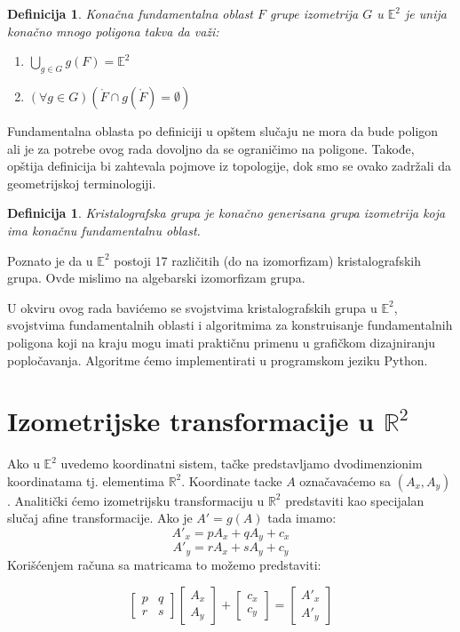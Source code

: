 \documentclass[11pt]{article}
\newtheorem{definition}[theorem]{\bf Definicija}
\begin{document}
\begin{definition} Konačna fundamentalna oblast \(F\)
grupe izometrija \(G\) u \(\mathbb{E}^2\) je unija konačno mnogo
poligona takva da važi:\\
\begin{enumerate}
\item \(\displaystyle{\bigcup_{g\in G}g(F)} = \mathbb{E}^2\) 
\item \((\forall g\in G)(\mathring{F} \cap g(\mathring{F})= \emptyset)\)
\end{enumerate}
\end{definition}
    Fundamentalna oblasta po definiciji u opštem slučaju ne mora da bude
poligon ali je za potrebe ovog rada dovoljno da se ograničimo na
poligone. Takođe, opštija definicija bi zahtevala pojmove iz topologije,
dok smo se ovako zadržali da geometrijskoj terminologiji.

\begin{definition} Kristalografska grupa je konačno
generisana grupa izometrija koja ima konačnu fundamentalnu oblast.
\end{definition}
    Poznato je da u \(\mathbb{E}^2\) postoji 17 različitih (do na
izomorfizam) kristalografskih grupa. Ovde mislimo na algebarski
izomorfizam grupa.

    U okviru ovog rada bavićemo se svojstvima kristalografskih grupa u
\(\mathbb{E}^2\), svojstvima fundamentalnih oblasti i algoritmima za
konstruisanje fundamentalnih poligona koji na kraju mogu imati praktičnu
primenu u grafičkom dizajniranju popločavanja. Algoritme ćemo
implementirati u programskom jeziku Python.

    \section{\texorpdfstring{Izometrijske transformacije u
\(\mathbb{R}^2\)}{Izometrijske transformacije u \textbackslash{}mathbb\{R\}\^{}2}}\label{izometrijske-transformacije-u-mathbbr2}

    Ako u \(\mathbb{E}^2\) uvedemo koordinatni sistem, tačke predstavljamo
dvodimenzionim koordinatama tj. elementima \(\mathbb{R}^2\). Koordinate
tacke \(A\) označavaćemo sa \((A_x, A_y)\). Analitički ćemo izometrijsku
transformaciju u \(\mathbb{R}^2\) predstaviti kao specijalan slučaj
afine transformacije. Ako je \(A' = g(A)\) tada imamo:
\[A'_x = pA_x + qA_y + c_x\] \[A'_y = rA_x + sA_y + c_y\] Korišćenjem
računa sa matricama to možemo predstaviti:

\[\begin{bmatrix}p & q\\ r & s\end{bmatrix} \begin{bmatrix}A_x\\ A_y \end{bmatrix} + \begin{bmatrix}c_x\\ c_y\end{bmatrix} = \begin{bmatrix}A'_x\\ A'_y \end{bmatrix}\]
\end{document}
